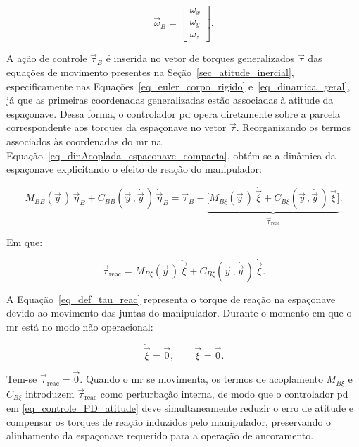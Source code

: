 \begin{equation}
\vec\omega_B =
\begin{bmatrix}
\omega_x \\
\omega_y \\
\omega_z
\end{bmatrix}.
\end{equation}

A ação de controle $\vec\tau_B$ é inserida no vetor de torques generalizados $\vec\tau$ das equações de movimento presentes na Seção~\ref{sec_atitude_inercial}, especificamente nas Equações~\eqref{eq_euler_corpo_rigido} e~\eqref{eq_dinamica_geral}, já que as primeiras coordenadas generalizadas estão associadas à atitude da espaçonave.
Dessa forma, o controlador \gls{pd} opera diretamente sobre a parcela correspondente aos torques da espaçonave no vetor $\vec\tau$.
Reorganizando os termos associados às coordenadas do \gls{mr} na
Equação~\eqref{eq_dinAcoplada_espaconave_compacta}, obtém-se a dinâmica da espaçonave explicitando o efeito de reação do manipulador:

\begin{equation}
M_{BB}(\vec y\,)\,\ddot{\vec\eta}_B
+
C_{BB}(\vec y\,,\dot{\vec y\,})\,\dot{\vec\eta}_B
=
\vec\tau_B
-
\underbrace{\bigl[
M_{B\xi}(\vec y\,)\,\ddot{\vec\xi}
+
C_{B\xi}(\vec y\,,\dot{\vec y\,})\,\dot{\vec\xi}
\bigr]}_{\displaystyle \vec\tau_{\text{reac}}}.
\label{eq_dina_espaconave_reac_compacta}
\end{equation}


Em que:

\begin{equation}
\vec\tau_{\text{reac}}
=
M_{B\xi}(\vec y\,)\,\ddot{\vec\xi}
+
C_{B\xi}(\vec y\,,\dot{\vec y\,})\,\dot{\vec\xi}.
\label{eq_def_tau_reac}
\end{equation}


A Equação~\ref{eq_def_tau_reac} representa o torque de reação na espaçonave devido ao movimento das juntas do manipulador.
Durante o momento em que o \gls{mr} está no modo não operacional:

\begin{equation}
\dot{\vec\xi} = \vec 0,
\qquad
\ddot{\vec\xi} = \vec 0.
\end{equation}


Tem-se $\vec\tau_{\text{reac}} = \vec 0$.
Quando o \gls{mr} se movimenta, os termos de acoplamento $M_{B\xi}$ e $C_{B\xi}$ introduzem $\vec\tau_{\text{reac}}$ como perturbação interna, de modo que o controlador \gls{pd} em \eqref{eq_controle_PD_atitude} deve simultaneamente reduzir o erro de atitude e compensar os torques de reação induzidos pelo manipulador, preservando o alinhamento da espaçonave requerido para a operação de ancoramento.
